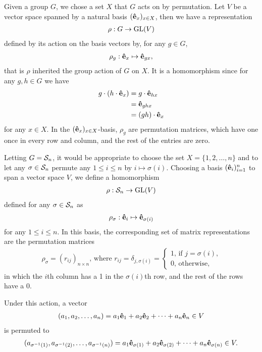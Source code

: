 	Given a group $G$, we chose a set $X$ that $G$ acts on by permutation. Let $V$ be a vector space spanned by a natural basis $(\mathbf{\hat{e}}_x)_{x \in X}$, then we have a representation
	\begin{align*}
		\rho:G \rightarrow \text{GL}(V)
	\end{align*} 
	defined by its action on the basis vectors by, for any $g \in G$, 
	\begin{align*}
		\rho_g: \mathbf{\hat{e}}_x \mapsto \mathbf{\hat{e}}_{gx},
	\end{align*}
	that is $\rho$ inherited the group action of $G$ on $X$. It is a homomorphism since for any $g,h \in G$ we have
	\begin{align*}
		g \cdot (h \cdot \mathbf{\hat{e}}_x) &= g \cdot \mathbf{\hat{e}}_{hx} \\
		&= \mathbf{\hat{e}}_{ghx} \\
		&= (gh) \cdot \mathbf{\hat{e}}_x
	\end{align*}
	for any $x \in X$.%
	In the $(\mathbf{\hat{e}}_x)_{x \in X}$-basis, $\rho_g$ are permutation matrices, which have one once in every row and column, and the rest of the entries are zero.
	
	Letting $G = \mathcal{S}_n$, it would be appropriate to choose the set $X = \{1, 2, \dots, n\}$ and to let any $\sigma \in \mathcal{S}_n$ permute any $1 \leq i \leq n$ by $i \mapsto \sigma(i)$. Choosing a basis $(\mathbf{\hat{e}}_i)_{i=1}^n$ to span a vector space $V$, we define a homomorphism
	\begin{align*}
		\rho: \mathcal{S}_n \rightarrow \text{GL}(V)
	\end{align*}
	defined for any $\sigma \in \mathcal{S}_n$ as
	\begin{align*}
		\rho_\sigma: \mathbf{\hat{e}}_i \mapsto \mathbf{\hat{e}}_{\sigma(i)}
	\end{align*}
	for any $1 \leq i \leq n$. In this basis, the corresponding set of matrix representations are the permutation matrices
	\begin{align*}
		\rho_\sigma = (r_{ij})_{n \times n} \text{, where } r_{ij} = \delta_{j,\sigma(i)} = \begin{cases}
			1 \text{, if $j = \sigma(i)$,} \\
			0 \text{, otherwise,}
		\end{cases}
	\end{align*}
	in which the $i$th column has a 1 in the $\sigma(i)$th row, and the rest of the rows have a 0.
	
	Under this action, a vector
	\begin{align*}
		(a_1, a_2, \dots, a_n) = a_1 \mathbf{\hat{e}}_1 + a_2 \mathbf{\hat{e}}_2 + \dots + a_n \mathbf{\hat{e}}_n \in V
	\end{align*}
	is permuted to 
	\begin{align*}
		(a_{\sigma^{-1}(1)}, a_{\sigma^{-1}(2)}, \dots, a_{\sigma^{-1}(n)}) = a_1 \mathbf{\hat{e}}_{\sigma(1)} + a_2 \mathbf{\hat{e}}_{\sigma(2)} + \dots + a_n \mathbf{\hat{e}}_{\sigma(n)}  \in V.
	\end{align*}
	
